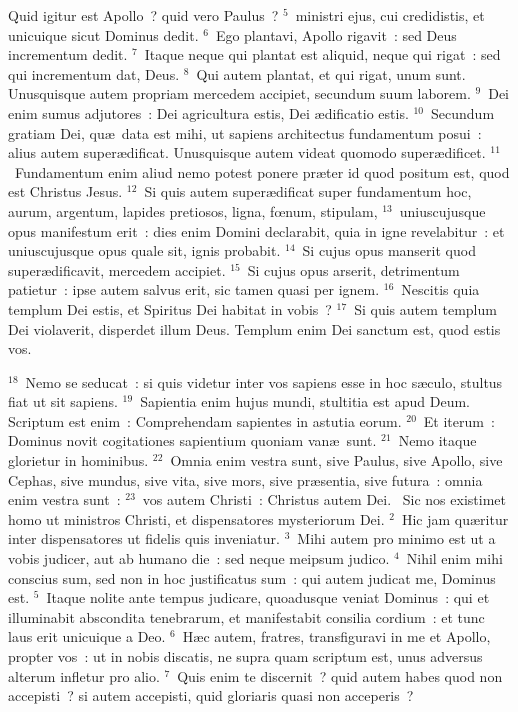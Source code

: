  Quid igitur est Apollo~? quid vero Paulus~?
${}^{5}$~ministri ejus, cui credidistis, et unicuique sicut Dominus dedit.
${}^{6}$~Ego plantavi, Apollo rigavit~: sed Deus incrementum dedit.
${}^{7}$~Itaque neque qui plantat est aliquid, neque qui rigat~: sed qui incrementum dat, Deus.
${}^{8}$~Qui autem plantat, et qui rigat, unum sunt. Unusquisque autem propriam mercedem accipiet, secundum suum laborem.
${}^{9}$~Dei enim sumus adjutores~: Dei agricultura estis, Dei \ae dificatio estis.
${}^{10}$~Secundum gratiam Dei, qu\ae\ data est mihi, ut sapiens architectus fundamentum posui~: alius autem super\ae dificat. Unusquisque autem videat quomodo super\ae dificet.
${}^{11}$~Fundamentum enim aliud nemo potest ponere pr\ae ter id quod positum est, quod est Christus Jesus.
${}^{12}$~Si quis autem super\ae dificat super fundamentum hoc, aurum, argentum, lapides pretiosos, ligna, fœnum, stipulam,
${}^{13}$~uniuscujusque opus manifestum erit~: dies enim Domini declarabit, quia in igne revelabitur~: et uniuscujusque opus quale sit, ignis probabit.
${}^{14}$~Si cujus opus manserit quod super\ae dificavit, mercedem accipiet.
${}^{15}$~Si cujus opus arserit, detrimentum patietur~: ipse autem salvus erit, sic tamen quasi per ignem.
${}^{16}$~Nescitis quia templum Dei estis, et Spiritus Dei habitat in vobis~?
${}^{17}$~Si quis autem templum Dei violaverit, disperdet illum Deus. Templum enim Dei sanctum est, quod estis vos.


${}^{18}$~Nemo se seducat~: si quis videtur inter vos sapiens esse in hoc s\ae culo, stultus fiat ut sit sapiens.
${}^{19}$~Sapientia enim hujus mundi, stultitia est apud Deum. Scriptum est enim~: Comprehendam sapientes in astutia eorum.
${}^{20}$~Et iterum~: Dominus novit cogitationes sapientium quoniam van\ae\ sunt.
${}^{21}$~Nemo itaque glorietur in hominibus.
${}^{22}$~Omnia enim vestra sunt, sive Paulus, sive Apollo, sive Cephas, sive mundus, sive vita, sive mors, sive pr\ae sentia, sive futura~: omnia enim vestra sunt~:
${}^{23}$~vos autem Christi~: Christus autem Dei.
~Sic nos existimet homo ut ministros Christi, et dispensatores mysteriorum Dei.
${}^{2}$~Hic jam qu\ae ritur inter dispensatores ut fidelis quis inveniatur.
${}^{3}$~Mihi autem pro minimo est ut a vobis judicer, aut ab humano die~: sed neque meipsum judico.
${}^{4}$~Nihil enim mihi conscius sum, sed non in hoc justificatus sum~: qui autem judicat me, Dominus est.
${}^{5}$~Itaque nolite ante tempus judicare, quoadusque veniat Dominus~: qui et illuminabit abscondita tenebrarum, et manifestabit consilia cordium~: et tunc laus erit unicuique a Deo.
${}^{6}$~H\ae c autem, fratres, transfiguravi in me et Apollo, propter vos~: ut in nobis discatis, ne supra quam scriptum est, unus adversus alterum infletur pro alio.
${}^{7}$~Quis enim te discernit~? quid autem habes quod non accepisti~? si autem accepisti, quid gloriaris quasi non acceperis~?



